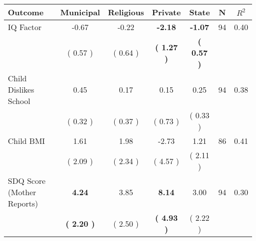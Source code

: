 \begin{tabular}{lcccccc}
\toprule
 \textbf{Outcome} & \textbf{Municipal} & \textbf{Religious} & \textbf{Private} & \textbf{State} & \textbf{N} & \textbf{$ R^2$} \\
\midrule
IQ Factor &     -0.67 &     -0.22 & \textbf{    -2.18} & \textbf{    -1.07} & 94 &      0.40 \\ 
 & (     0.57 ) & (     0.64 ) & \textbf{(     1.27 )} & \textbf{(     0.57 )} & \\
Child Dislikes School &      0.45 &      0.17 &      0.15 &      0.25 & 94 &      0.38 \\ 
 & (     0.32 ) & (     0.37 ) & (     0.73 ) & (     0.33 ) & \\
Child BMI &      1.61 &      1.98 &     -2.73 &      1.21 & 86 &      0.41 \\ 
 & (     2.09 ) & (     2.34 ) & (     4.57 ) & (     2.11 ) & \\
SDQ Score (Mother Reports) & \textbf{     4.24} &      3.85 & \textbf{     8.14} &      3.00 & 94 &      0.30 \\ 
 & \textbf{(     2.20 )} & (     2.50 ) & \textbf{(     4.93 )} & (     2.22 ) & \\
\bottomrule
\end{tabular}
